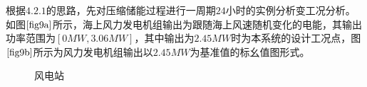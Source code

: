 \documentclass{jnuthesis}
\begin{document}
	\par 根据$ 4.2.1 $的思路，先对压缩储能过程进行一周期$ 24 $小时的实例分析变工况分析。如图$ \fontsize{10.5bp}{10pt}\ref{fig9a} $所示，海上风力发电机组输出为跟随海上风速随机变化的电能，其输出功率范围为$ [0MW,3.06MW] $，其中输出为$ 2.45MW $时为本系统的设计工况点，图$ \fontsize{10.5bp}{10pt}\ref{fig9b} $所示为风力发电机组输出以$ 2.45MW $为基准值的标幺值图形式。\\
	\begin{figure}[H]
		\caption{\fontsize{10.5bp}{10pt}风电站} %
		\label{fig:9}  %
	\end{figure}
	
\end{document}
